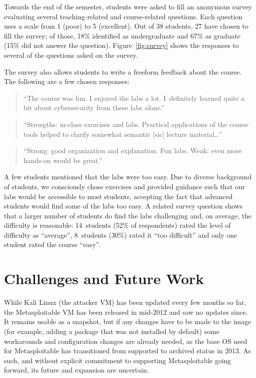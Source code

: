 \documentclass{sig-alternate-2013}
\begin{document}
Towards the end of the semester, students were asked to fill an anonymous survey evaluating several teaching-related and
course-related questions. Each question uses a scale from 1 (poor) to 5 (excellent). Out of 38 students, 27 have
chosen to fill the survey; of those, 18\% identified as undergraduate and 67\% as graduate (15\% did not answer the question).
Figure~\ref{fig:survey} shows the responses to several of the questions asked on the survey.

The survey also allows students to write a freeform feedback about the course. The following are a few chosen responses:

\begin{quote}``The course was fun. I enjoyed the labs a lot. 
I~definitely learned quite a bit about cybersecurity from these labs alone.''\end{quote}

\begin{quote}``Strengths: in-class exercises and labs. Practical applications of the course tools helped to clarify
somewhat semantic [sic] lecture material\ldots''\end{quote}

\begin{quote}``Strong: good organization and explanation. Fun labs. Weak: even more hands-on would be great.''\end{quote}

A few students mentioned that the labs were too easy. Due to diverse background of students, we consciously chose
exercises and provided guidance such that our labs would be accessible to most students, accepting the fact 
that advanced students would find some of the labs too easy. A related survey question shows that a larger number 
of students do find the labs challenging and, on average, the difficulty is reasonable: 
14~students (52\% of respondents) rated the level of difficulty as ``average'', 
8~students (30\%) rated it ``too difficult'' and only one student rated the course ``easy''.

\section{Challenges and Future Work}

While Kali Linux (the attacker VM) has been updated every few months so far, the Metasploitable VM has been released in mid-2012
and saw no updates since. It remains usable as a snapshot, but if any changes have to be made to the image 
(for example, adding a package that was not installed by default) some workarounds and configuration changes
are already needed, as the base OS used for Metasploitable has transitioned from supported to archived status in 2013. As
such, and without explicit commitment to supporting Metasploitable going forward, its future and expansion are uncertain.
\end{document}
